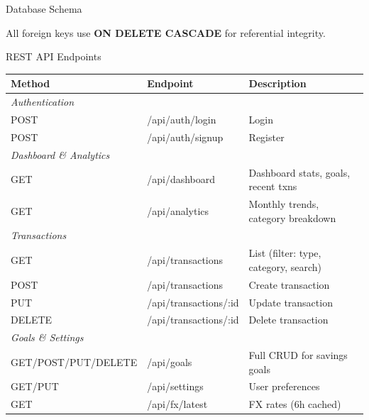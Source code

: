\documentclass[aspectratio=169, 12pt]{beamer}
\begin{document}
\begin{frame}{Database Schema}
\begin{center}
\end{center}

\vspace{4pt}
\begin{center}
\small All foreign keys use \textbf{ON DELETE CASCADE} for referential integrity.
\end{center}
\end{frame}

\begin{frame}{REST API Endpoints}

\begin{center}
\scriptsize
\begin{tabular}{l l l}
\toprule
\textbf{Method} & \textbf{Endpoint} & \textbf{Description} \\
\midrule
\multicolumn{3}{l}{\textit{\textcolor{primary}{Authentication}}} \\
POST & /api/auth/login & Login \\
POST & /api/auth/signup & Register \\
\midrule
\multicolumn{3}{l}{\textit{\textcolor{primary}{Dashboard \& Analytics}}} \\
GET & /api/dashboard & Dashboard stats, goals, recent txns \\
GET & /api/analytics & Monthly trends, category breakdown \\
\midrule
\multicolumn{3}{l}{\textit{\textcolor{primary}{Transactions}}} \\
GET & /api/transactions & List (filter: type, category, search) \\
POST & /api/transactions & Create transaction \\
PUT & /api/transactions/:id & Update transaction \\
DELETE & /api/transactions/:id & Delete transaction \\
\midrule
\multicolumn{3}{l}{\textit{\textcolor{primary}{Goals \& Settings}}} \\
GET/POST/PUT/DELETE & /api/goals & Full CRUD for savings goals \\
GET/PUT & /api/settings & User preferences \\
GET & /api/fx/latest & FX rates (6h cached) \\
\bottomrule
\end{tabular}
\end{center}
\end{frame}
\end{document}
